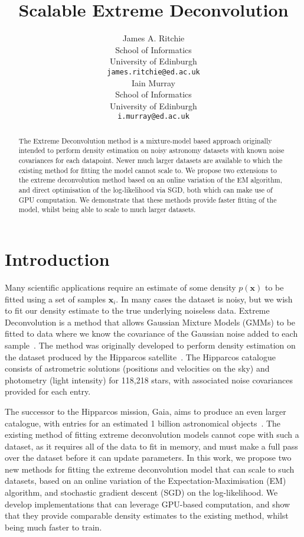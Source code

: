 \documentclass{article}
\title{Scalable Extreme Deconvolution}
\author{
  James A. Ritchie\\
  School of Informatics\\
  University of Edinburgh\\
   \texttt{james.ritchie@ed.ac.uk} \\
  \And
  Iain Murray\\
  School of Informatics\\
  University of Edinburgh\\
   \texttt{i.murray@ed.ac.uk} \\
}
\newcommand{\bx}{\mathbf{x}}
\begin{document}
\maketitle

\begin{abstract}

The Extreme Deconvolution method is a mixture-model based approach originally intended to perform density estimation on noisy astronomy datasets with known noise covariances for each datapoint.
Newer much larger datasets are available to which the existing method for fitting the model cannot scale to.
We propose two extensions to the extreme deconvolution method based on an online variation of the EM algorithm, and direct optimisation of the log-likelihood via SGD, both which can make use of GPU computation.
We demonstrate that these methods provide faster fitting of the model, whilst being able to scale to much larger datasets.

\end{abstract}

\section{Introduction}

Many scientific applications require an estimate of some density $p(\bx)$ to be fitted using a set of samples $\bx_i$.
In many cases the dataset is noisy, but we wish to fit our density estimate to the true underlying noiseless data.
Extreme Deconvolution is a method that allows Gaussian Mixture Models (GMMs) to be fitted to data where we know the covariance of the Gaussian noise added to each sample~\cite{bovyExtremeDeconvolutionInferring2011}.
The method was originally developed to perform density estimation on the dataset produced by the Hipparcos satellite~\cite{perrymanHipparcosCatalogue1997}.
The Hipparcos catalogue consists of astrometric solutions (positions and velocities on the sky) and photometry (light intensity) for 118,218 stars, with associated noise covariances provided for each entry.

The successor to the Hipparcos mission, Gaia, aims to produce an even larger catalogue, with entries for an estimated 1 billion astronomical objects~\cite{collaborationGaiaMission2016}.
The existing method of fitting extreme deconvolution models cannot cope with such a dataset, as it requires all of the data to fit in memory, and must make a full pass over the dataset before it can update parameters.
In this work, we propose two new methods for fitting the extreme deconvolution model that can scale to such datasets, based on an online variation of the Expectation-Maximisation (EM) algorithm, and stochastic gradient descent (SGD) on the log-likelihood.
We develop implementations that can leverage GPU-based computation, and show that they provide comparable density estimates to the existing method, whilst being much faster to train.
\end{document}
